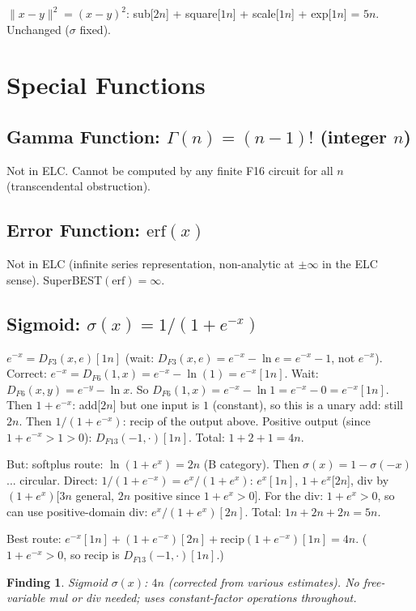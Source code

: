 \documentclass[11pt]{article}
\newtheorem{finding}[theorem]{Finding}
\newcommand{\ok}[1]{\textcolor{ok}{#1}}
\begin{document}
$\|x-y\|^2 = (x-y)^2$: sub[$2n$] + square[$1n$] + scale[$1n$] + exp[$1n$] = $5n$. \ok{Unchanged ($\sigma$ fixed).}

\section{Special Functions}

\subsection{Gamma Function: $\Gamma(n) = (n-1)!$ (integer $n$)}

Not in ELC. Cannot be computed by any finite F16 circuit for all $n$ (transcendental obstruction).

\subsection{Error Function: $\mathrm{erf}(x)$}

Not in ELC (infinite series representation, non-analytic at $\pm\infty$ in the ELC sense).
SuperBEST$(\mathrm{erf}) = \infty$.

\subsection{Sigmoid: $\sigma(x) = 1/(1+e^{-x})$}

$e^{-x} = D_{F3}(x, e)[1n]$ (wait: $D_{F3}(x,e) = e^{-x} - \ln e = e^{-x} - 1$, not $e^{-x}$).
Correct: $e^{-x} = D_{F6}(1,x) = e^{-x} - \ln(1) = e^{-x}[1n]$.
Wait: $D_{F6}(x,y) = e^{-y} - \ln x$. So $D_{F6}(1,x) = e^{-x} - \ln 1 = e^{-x} - 0 = e^{-x}[1n]$.
Then $1+e^{-x}$: add[$2n$] but one input is $1$ (constant), so this is a unary add: still $2n$.
Then $1/(1+e^{-x})$: recip of the output above. Positive output (since $1+e^{-x} > 1 > 0$): $D_{F13}(-1, \cdot)[1n]$.
Total: $1+2+1 = 4n$.

But: softplus route: $\ln(1+e^x) = 2n$ (B category). Then $\sigma(x) = 1 - \sigma(-x)$... circular.
Direct: $1/(1+e^{-x}) = e^x/(1+e^x)$: $e^x[1n]$, $1+e^x$[$2n$], div by $(1+e^x)$[$3n$ general, $2n$ positive since $1+e^x > 0$].
For the div: $1+e^x > 0$, so can use positive-domain div: $e^x/(1+e^x)[2n]$.
Total: $1n + 2n + 2n = 5n$.

Best route: $e^{-x}[1n] + (1+e^{-x})[2n] + \mathrm{recip}(1+e^{-x})[1n] = 4n$.
($1+e^{-x} > 0$, so recip is $D_{F13}(-1, \cdot)[1n]$.)

\begin{finding}
Sigmoid $\sigma(x)$: \ok{$4n$ (corrected from various estimates)}.
No free-variable mul or div needed; uses constant-factor operations throughout.
\end{finding}
\end{document}
